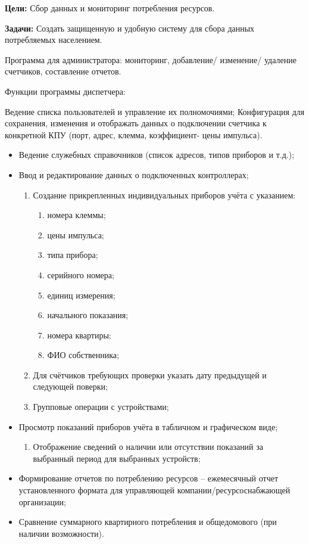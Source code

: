 \textbf{Цели:} Сбор данных и мониторинг потребления ресурсов.
 
\textbf{Задачи:}  Создать защищенную и удобную систему  для сбора данных потребляемых населением.

Программа для администратора: мониторинг, добавление/ изменение/ удаление счетчиков, составление отчетов. 

Функции программы диспетчера:

Ведение списка пользователей и управление их полномочиями;
Конфигурация для сохранения, изменения и отображать данных о подключении счетчика к конкретной КПУ (порт, адрес, клемма, коэффициент- цены импульса). 
\begin{itemize}
	\item Ведение служебных справочников (список адресов, типов приборов и т.д.);
	\item Ввод и редактирование данных о подключенных контроллерах;
	\begin{enumerate}
		\item Создание прикрепленных индивидуальных приборов учёта с указанием:
		\begin{enumerate}
			\item номера клеммы; 
			\item цены импульса; 
			\item типа прибора;
			\item серийного номера; 
			\item единиц измерения;
			\item начального показания;
			\item номера квартиры;
			\item ФИО собственника;
		\end{enumerate}
		\item Для счётчиков требующих проверки указать дату предыдущей и следующей поверки;
		\item Групповые операции с устройствами;
	\end{enumerate}
	\item Просмотр показаний приборов учёта в табличном и графическом виде;
	\begin{enumerate}
		\item Отображение сведений о наличии или отсутствии показаний за выбранный период для выбранных устройств;
	\end{enumerate}
	\item Формирование отчетов по потреблению ресурсов – ежемесячный отчет установленного формата для управляющей компании/ресурсоснабжающей организации;
	\item Сравнение суммарного квартирного потребления и общедомового (при наличии возможности).
	
\end{itemize}